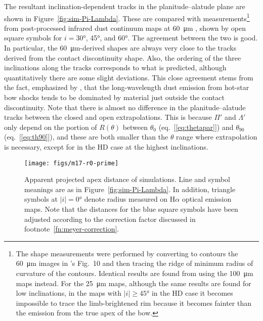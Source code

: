 \documentclass[useAMS, usenatbib, a4paper]{mnras}
\providecommand{\abs}[1]{\lvert#1\rvert}
\begin{document}
The resultant inclination-dependent tracks in the planitude--alatude
plane are shown in Figure~\ref{fig:sim-Pi-Lambda}.  These are compared
with measurements\footnote{%
  The shape measurements were performed by converting to contours the
  \SI{60}{\um} images in \citet{Meyer:2017a}'s Fig.~10 and then
  tracing the ridge of minimum radius of curvature of the contours.
  Identical results are found from using the \SI{100}{\um} maps
  instead.  For the \SI{25}{\um} maps, although the same results are
  found for low inclinations, in the maps with
  \(\abs{i} \ge \ang{45}\) in the HD case it becomes impossible to trace
  the limb-brightened rim because it becomes fainter than the emission
  from the true apex of the bow.} %
from post-processed infrared dust continuum maps at \SI{60}{\um}
\citep[\S~4.3 of][]{Meyer:2017a}, shown by open square symbols for
\(i = \ang{30}\), \ang{45}, and \ang{60}.  The agreement between the
two is good.  In particular, the \SI{60}{\um}-derived shapes are
always very close to the tracks derived from the contact discontinuity
shape. Also, the ordering of the three inclinations along the tracks
corresponds to what is predicted, although quantitatively there are
some slight deviations.  This close agreement stems from the fact,
emphasized by \citet{Meyer:2014b}, that the long-wavelength dust
emission from hot-star bow shocks tends to be dominated by material
just outside the contact discontinuity.  Note that there is almost no
difference in the planitude--alatude tracks between the closed and open
extrapolations.  This is because \(\Pi'\) and \(\Lambda'\) only depend on the
portion of \(R(\theta)\) between \(\theta_0\) (eq.~[\ref{eq:thetapar}]) and
\(\theta_{90}\) (eq.~[\ref{eq:th90}]), and these are both smaller than the
\(\theta\) range where extrapolation is necessary, except for in the HD
case at the highest inclinations.

\begin{figure}
  \centering
  \texttt{[image: figs/m17-r0-prime]}
  \caption[]{Apparent projected apex distance of simulations.  Line
    and symbol meanings are as in Figure~\ref{fig:sim-Pi-Lambda}.  In
    addition, triangle symbols at \(\abs{i} = \ang{0}\) denote radius
    measured on H\(\alpha\) optical emission maps.  Note that the distances
    for the blue square symbols have been adjusted according to the
    correction factor discussed in
    footnote~\ref{fn:meyer-correction}.}
  \label{fig:sim-R0-prime}
\end{figure}
\end{document}
